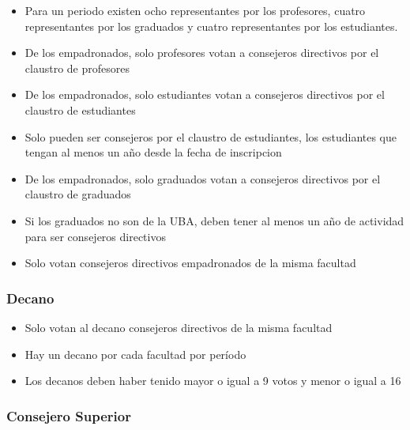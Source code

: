 \documentclass[a4paper, 10pt, twoside]{article}
\begin{document}
\begin{itemize}
\item Para un periodo existen ocho representantes por los profesores, cuatro representantes por los graduados y cuatro representantes por los estudiantes.
\item De los empadronados, solo profesores votan a consejeros directivos por el claustro de profesores
\item De los empadronados, solo estudiantes votan a consejeros directivos por el claustro de estudiantes
\item Solo pueden ser consejeros por el claustro de estudiantes, los estudiantes que tengan al menos un año desde la fecha de inscripcion
\item De los empadronados, solo graduados votan a consejeros directivos por el claustro de graduados
\item Si los graduados no son de la UBA, deben tener al menos un año de actividad para ser consejeros directivos
\item Solo votan consejeros directivos empadronados de la misma facultad
\end{itemize}


\subsubsection{Decano}

\begin{itemize}
\item Solo votan al decano consejeros directivos de la misma facultad
\item Hay un decano por cada facultad por período
\item Los decanos deben haber tenido mayor o igual a 9 votos y menor o igual a 16
\end{itemize}


\subsubsection{Consejero Superior}
\end{document}
